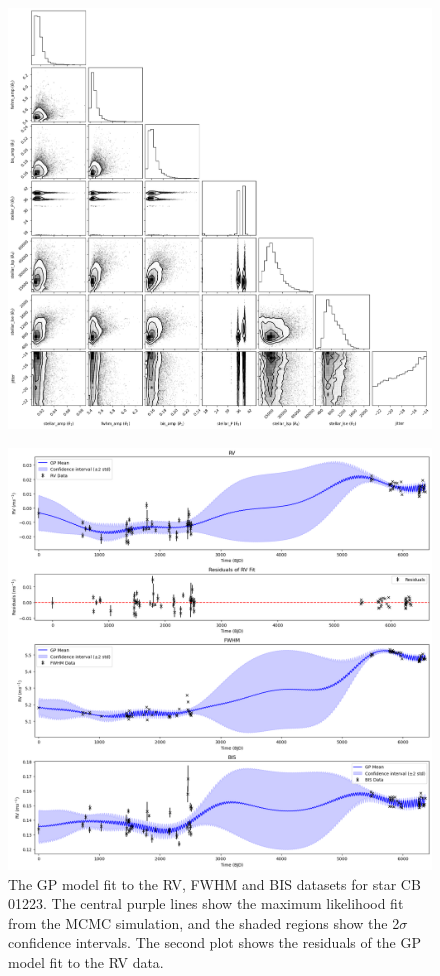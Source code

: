 \begin{figure}[htb]
    \centering
    \includegraphics[width=1\textwidth]{figures/stellar_noise_corner_plot}
    \caption{}
    \label{fig:stellar_noise_corner_plot}
\end{figure}

\begin{figure}[htb]
    \centering
    \includegraphics[width=1\textwidth]{figures/stellar_noise_fit}
    \caption{The GP model fit to the RV, FWHM and BIS datasets for star CB 01223.
    The central purple lines show the maximum likelihood fit from the MCMC simulation, and the shaded regions show the
    2$\sigma$ confidence intervals.
    The second plot shows the residuals of the GP model fit to the RV data.}
    \label{fig:stellar_noise_fit}
\end{figure}

